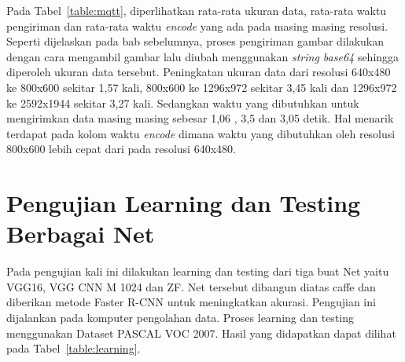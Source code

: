 \begin{table}[ht]
\centering
\caption{Tabel Pengukuran Kecepatan Pengiriman dan Penerimaan Gambar}
\label{table:mqtt}
\end{table}

Pada Tabel~\ref{table:mqtt}, diperlihatkan rata-rata ukuran data, rata-rata waktu pengiriman dan rata-rata waktu \textit{encode} yang ada pada masing masing resolusi. Seperti dijelaskan pada bab sebelumnya, proses pengiriman gambar dilakukan dengan cara mengambil gambar lalu diubah menggunakan \textit{string base64} sehingga diperoleh ukuran data tersebut. Peningkatan ukuran data dari resolusi 640x480 ke 800x600 sekitar 1,57 kali, 800x600 ke 1296x972 sekitar 3,45 kali dan 1296x972 ke 2592x1944 sekitar 3,27 kali. Sedangkan waktu yang dibutuhkan untuk mengirimkan data masing masing sebesar 1,06 , 3,5 dan 3,05 detik. Hal menarik terdapat pada kolom waktu \textit{encode} dimana waktu yang dibutuhkan oleh resolusi 800x600 lebih cepat dari pada resolusi 640x480.


\section{Pengujian Learning dan Testing Berbagai Net}

Pada pengujian kali ini dilakukan learning dan testing dari tiga buat Net yaitu VGG16, VGG CNN M 1024 dan ZF. Net tersebut dibangun diatas caffe dan diberikan metode Faster R-CNN untuk meningkatkan akurasi. Pengujian ini dijalankan pada komputer pengolahan data. Proses learning dan testing menggunakan Dataset PASCAL VOC 2007. Hasil yang didapatkan dapat dilihat pada Tabel~\ref{table:learning}.

\begin{table}[ht]
\centering
\caption{Tabel Pengukuran Kecepatan Learning dan Testing}
\label{table:learning}
\end{table}

